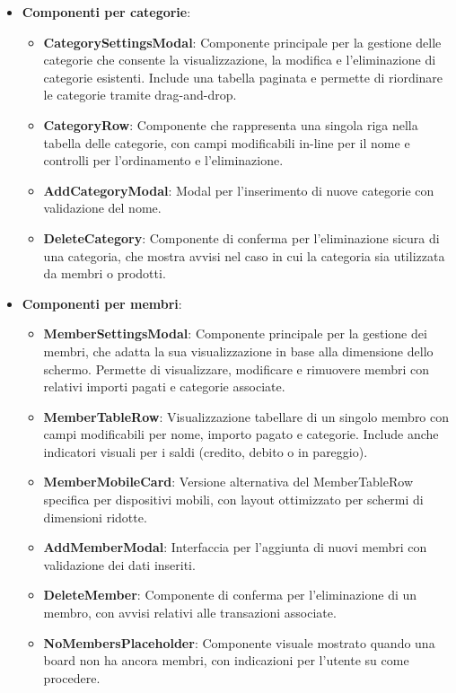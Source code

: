 \documentclass[11pt]{article}
\begin{document}
\begin{itemize}
    \item \textbf{Componenti per categorie}:
    \begin{itemize}
        \item \textbf{CategorySettingsModal}: Componente principale per la gestione delle categorie che consente la visualizzazione, la modifica e l'eliminazione di categorie esistenti. Include una tabella paginata e permette di riordinare le categorie tramite drag-and-drop.
        \item \textbf{CategoryRow}: Componente che rappresenta una singola riga nella tabella delle categorie, con campi modificabili in-line per il nome e controlli per l'ordinamento e l'eliminazione.
        \item \textbf{AddCategoryModal}: Modal per l'inserimento di nuove categorie con validazione del nome.
        \item \textbf{DeleteCategory}: Componente di conferma per l'eliminazione sicura di una categoria, che mostra avvisi nel caso in cui la categoria sia utilizzata da membri o prodotti.
    \end{itemize}

    \item \textbf{Componenti per membri}:
    \begin{itemize}
        \item \textbf{MemberSettingsModal}: Componente principale per la gestione dei membri, che adatta la sua visualizzazione in base alla dimensione dello schermo. Permette di visualizzare, modificare e rimuovere membri con relativi importi pagati e categorie associate.
        \item \textbf{MemberTableRow}: Visualizzazione tabellare di un singolo membro con campi modificabili per nome, importo pagato e categorie. Include anche indicatori visuali per i saldi (credito, debito o in pareggio).
        \item \textbf{MemberMobileCard}: Versione alternativa del MemberTableRow specifica per dispositivi mobili, con layout ottimizzato per schermi di dimensioni ridotte.
        \item \textbf{AddMemberModal}: Interfaccia per l'aggiunta di nuovi membri con validazione dei dati inseriti.
        \item \textbf{DeleteMember}: Componente di conferma per l'eliminazione di un membro, con avvisi relativi alle transazioni associate.
        \item \textbf{NoMembersPlaceholder}: Componente visuale mostrato quando una board non ha ancora membri, con indicazioni per l'utente su come procedere.
    \end{itemize}


\end{itemize}
\end{document}
